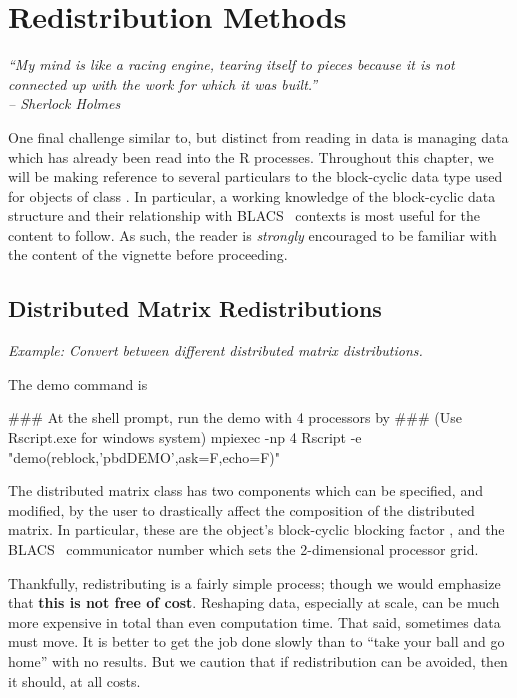\chapter{Redistribution Methods}
\label{sec:redist}


{\it
``My mind is like a racing engine, tearing itself to pieces because it is not
connected up with the work for which it was built.'' \\
\--- Sherlock Holmes 
}
\vspace{0.5cm}


One final challenge similar to, but distinct from reading in data is managing data which has already been read into the R processes.  Throughout this chapter, we will be making reference to several particulars to the block-cyclic data type used for objects of
class .
In particular, a working knowledge of the block-cyclic data structure and their relationship with BLACS~ contexts is most useful for the content to follow.  As such, the reader is \emph{strongly} encouraged to be familiar with the content of the  vignette before proceeding.

\section{Distributed Matrix Redistributions}
\label{sec:dmatredist}

\emph{Example:  Convert between different distributed matrix distributions.}

The demo command is
\begin{Command}
### At the shell prompt, run the demo with 4 processors by
### (Use Rscript.exe for windows system)
mpiexec -np 4 Rscript -e "demo(reblock,'pbdDEMO',ask=F,echo=F)"
\end{Command}

The distributed matrix class 
has two components which can be specified, and modified, by the user to 
drastically affect the composition of the distributed matrix.  In particular, 
these are the object's block-cyclic blocking factor , and the 
BLACS~ communicator number  which sets the 
2-dimensional processor grid. 

Thankfully, redistributing is a fairly simple process; though we would emphasize 
that \textbf{this is not free of cost}.  Reshaping data, especially at scale, 
can be much more expensive in total than even computation time.  That said, 
sometimes data must move.  It is better to get the job done slowly than to 
``take your ball and go home'' with no results.  But we caution that if 
redistribution can be avoided, then it should, at all costs.

